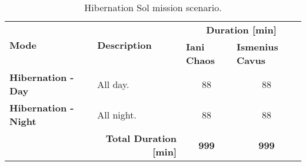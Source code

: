 \begin{table}[h]
\small
\centering
\caption{Hibernation Sol mission scenario.}
\label{tab:mission-scenario-hibernation-sol}
\begin{tabular}{l|l|c|c|}
\hline
\multicolumn{1}{|l|}{\multirow{2}{*}{\textbf{Mode}}} & \multirow{2}{*}{\textbf{Description}} & \multicolumn{2}{c|}{\textbf{Duration {[}min{]}}} \\ \cline{3-4}
\multicolumn{1}{|l|}{} &  & \multicolumn{1}{l|}{\textbf{Iani Chaos}} & \multicolumn{1}{l|}{\textbf{Ismenius Cavus}} \\ \hline
\multicolumn{1}{|l|}{\textbf{Hibernation - Day}} & All day. & 88 & 88 \\ \hline
\multicolumn{1}{|l|}{\textbf{Hibernation - Night}} & All night. & 88 & 88 \\ \hline
 & \multicolumn{1}{r|}{\textbf{Total Duration {[}min{]}}} & \textbf{999} & \textbf{999} \\ \cline{2-4}
\end{tabular}
\end{table}
